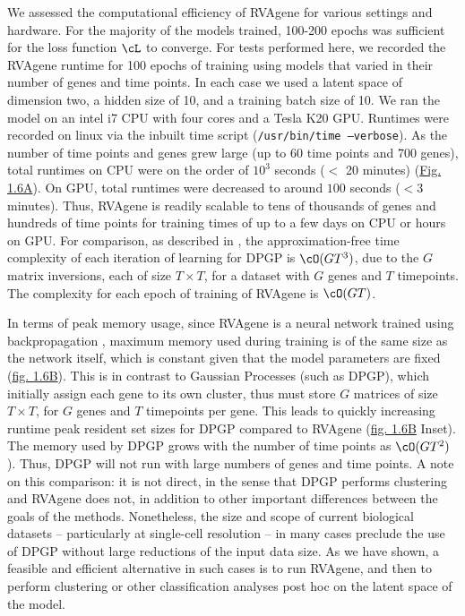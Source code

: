 We assessed the computational efficiency of RVAgene for various settings and hardware. For the
majority of the models trained, 100-200 epochs was sufficient for the loss function $\cL$ to
converge. For tests performed here, we recorded the RVAgene runtime for 100 epochs of training using
models that varied in their number of genes and time points. In each case we used a latent space of
dimension two, a hidden size of 10, and a training batch size of 10. We ran the model on an intel i7
CPU with four cores and a Tesla K20 GPU. Runtimes were recorded on linux via the inbuilt time script
(\texttt{/usr/bin/time --verbose}). As the number of time points and genes grew large (up to 60 time
points and 700 genes), total runtimes on CPU were on the order of $10^3$ seconds ($<$ 20 minutes)
(\hyperref[fig:fig7]{Fig. 1.6A}). On GPU, total runtimes were decreased to around $100$ seconds ($< 3$ minutes). Thus, RVAgene is readily scalable to tens of thousands of genes and hundreds of time points for training times of up to a few days on CPU or hours on GPU. For comparison, as described in \citet{McDowell2018}, the approximation-free time complexity of each iteration of learning for DPGP is $\cO(GT^3)$, due to the $G$ matrix inversions, each of size $T \times T$, for a dataset with $G$ genes and $T$ timepoints. The complexity for each epoch of training of RVAgene is $\cO(GT)$.
\par 
In terms of peak memory usage, since RVAgene is a neural network trained using backpropagation
\citep{rumelhart1986learning}, maximum memory used during training is of the same size as the
network itself, which is constant given that the model parameters are fixed
(\hyperref[fig:fig7]{fig. 1.6B}). This is in contrast to Gaussian Processes (such as DPGP), which
initially assign each gene to its own cluster, thus must store $G$ matrices of size $T\times T $,
for $G$ genes and $T$ timepoints per gene. This leads to quickly increasing runtime peak resident
set sizes for DPGP compared to RVAgene (\hyperref[fig:fig7]{fig. 1.6B} Inset). The memory used by DPGP grows with the number of time points as $\cO(GT^2)$). Thus, DPGP will not run with large numbers of genes and time points. %
A note on this comparison: it is not direct, in the sense that DPGP performs clustering and RVAgene does not, in addition to other important differences between the goals of the methods. 
Nonetheless, the size and scope of current biological datasets -- particularly at single-cell resolution -- in many cases preclude the use of DPGP without large reductions of the input data size. As we have shown, a feasible and efficient alternative in such cases is to run RVAgene, and then to perform clustering or other classification analyses post hoc on the latent space of the model. 

